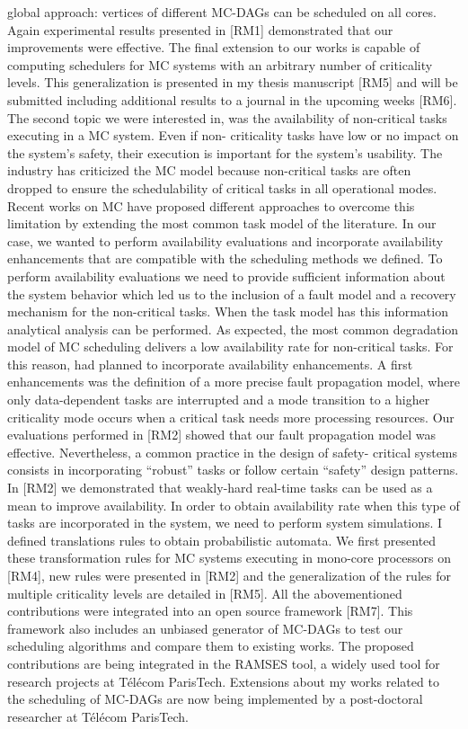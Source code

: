 \documentclass{article}
\begin{document}
global approach:
vertices of different MC-DAGs can be scheduled on all cores. Again experimental results presented in [RM1] 
demonstrated
that our improvements were effective. The final extension to our works is capable of computing schedulers 
for MC systems
with an arbitrary number of criticality levels. This generalization is presented in my thesis manuscript [RM5] 
and will be
submitted including additional results to a journal in the upcoming weeks [RM6].
The second topic we were interested in, was the availability of non-critical tasks executing in a MC system. 
Even if non-
criticality tasks have low or no impact on the system’s safety, their execution is important for the system’s 
usability. The
industry has criticized the MC model because non-critical tasks are often dropped to ensure the 
schedulability of critical
tasks in all operational modes. Recent works on MC have proposed different approaches to overcome this 
limitation by
extending the most common task model of the literature. In our case, we wanted to perform availability 
evaluations and
incorporate availability enhancements that are compatible with the scheduling methods we defined. To 
perform availability
evaluations we need to provide sufficient information about the system behavior which led us to the inclusion 
of a fault
model and a recovery mechanism for the non-critical tasks. When the task model has this information 
analytical analysis
can be performed. As expected, the most common degradation model of MC scheduling delivers a low 
availability rate for
non-critical tasks. For this reason, had planned to incorporate availability enhancements. A first 
enhancements was the
definition of a more precise fault propagation model, where only data-dependent tasks are interrupted and 
a mode transition
to a higher criticality mode occurs when a critical task needs more processing resources. Our evaluations 
performed in
[RM2] showed that our fault propagation model was effective. Nevertheless, a common practice in the 
design of safety-
critical systems consists in incorporating “robust” tasks or follow certain “safety” design patterns. In [RM2] 
we demonstrated
that weakly-hard real-time tasks can be used as a mean to improve availability. In order to obtain availability 
rate when this
type of tasks are incorporated in the system, we need to perform system simulations. I defined translations 
rules to obtain
probabilistic automata. We first presented these transformation rules for MC systems executing in 
mono-core processors
on [RM4], new rules were presented in [RM2] and the generalization of the rules for multiple criticality 
levels are detailed in
[RM5].
All the abovementioned contributions were integrated into an open source framework [RM7]. This 
framework also includes
an unbiased generator of MC-DAGs to test our scheduling algorithms and compare them to existing works. 
The proposed
contributions are being integrated in the RAMSES tool, a widely used tool for research projects at Télécom 
ParisTech.
Extensions about my works related to the scheduling of MC-DAGs are now being implemented by a 
post-doctoral researcher
at Télécom ParisTech.
\end{document}
